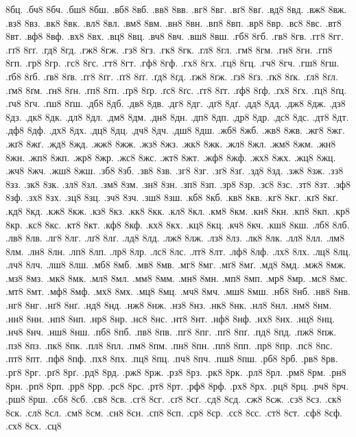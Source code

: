 {8бц.
.бч8
8бч.
.бш8
8бш.
.вб8
8вб.
.вв8
8вв.
.вг8
8вг.
.вґ8
8вґ.
.вд8
8вд.
.вж8
8вж.
.вз8
8вз.
.вк8
8вк.
.вл8
8вл.
.вм8
8вм.
.вн8
8вн.
.вп8
8вп.
.вр8
8вр.
.вс8
8вс.
.вт8
8вт.
.вф8
8вф.
.вх8
8вх.
.вц8
8вц.
.вч8
8вч.
.вш8
8вш.
.гб8
8гб.
.гв8
8гв.
.гг8
8гг.
.гґ8
8гґ.
.гд8
8гд.
.гж8
8гж.
.гз8
8гз.
.гк8
8гк.
.гл8
8гл.
.гм8
8гм.
.гн8
8гн.
.гп8
8гп.
.гр8
8гр.
.гс8
8гс.
.гт8
8гт.
.гф8
8гф.
.гх8
8гх.
.гц8
8гц.
.гч8
8гч.
.гш8
8гш.
.ґб8
8ґб.
.ґв8
8ґв.
.ґг8
8ґг.
.ґґ8
8ґґ.
.ґд8
8ґд.
.ґж8
8ґж.
.ґз8
8ґз.
.ґк8
8ґк.
.ґл8
8ґл.
.ґм8
8ґм.
.ґн8
8ґн.
.ґп8
8ґп.
.ґр8
8ґр.
.ґс8
8ґс.
.ґт8
8ґт.
.ґф8
8ґф.
.ґх8
8ґх.
.ґц8
8ґц.
.ґч8
8ґч.
.ґш8
8ґш.
.дб8
8дб.
.дв8
8дв.
.дг8
8дг.
.дґ8
8дґ.
.дд8
8дд.
.дж8
8дж.
.дз8
8дз.
.дк8
8дк.
.дл8
8дл.
.дм8
8дм.
.дн8
8дн.
.дп8
8дп.
.др8
8др.
.дс8
8дс.
.дт8
8дт.
.дф8
8дф.
.дх8
8дх.
.дц8
8дц.
.дч8
8дч.
.дш8
8дш.
.жб8
8жб.
.жв8
8жв.
.жг8
8жг.
.жґ8
8жґ.
.жд8
8жд.
.жж8
8жж.
.жз8
8жз.
.жк8
8жк.
.жл8
8жл.
.жм8
8жм.
.жн8
8жн.
.жп8
8жп.
.жр8
8жр.
.жс8
8жс.
.жт8
8жт.
.жф8
8жф.
.жх8
8жх.
.жц8
8жц.
.жч8
8жч.
.жш8
8жш.
.зб8
8зб.
.зв8
8зв.
.зг8
8зг.
.зґ8
8зґ.
.зд8
8зд.
.зж8
8зж.
.зз8
8зз.
.зк8
8зк.
.зл8
8зл.
.зм8
8зм.
.зн8
8зн.
.зп8
8зп.
.зр8
8зр.
.зс8
8зс.
.зт8
8зт.
.зф8
8зф.
.зх8
8зх.
.зц8
8зц.
.зч8
8зч.
.зш8
8зш.
.кб8
8кб.
.кв8
8кв.
.кг8
8кг.
.кґ8
8кґ.
.кд8
8кд.
.кж8
8кж.
.кз8
8кз.
.кк8
8кк.
.кл8
8кл.
.км8
8км.
.кн8
8кн.
.кп8
8кп.
.кр8
8кр.
.кс8
8кс.
.кт8
8кт.
.кф8
8кф.
.кх8
8кх.
.кц8
8кц.
.кч8
8кч.
.кш8
8кш.
.лб8
8лб.
.лв8
8лв.
.лг8
8лг.
.лґ8
8лґ.
.лд8
8лд.
.лж8
8лж.
.лз8
8лз.
.лк8
8лк.
.лл8
8лл.
.лм8
8лм.
.лн8
8лн.
.лп8
8лп.
.лр8
8лр.
.лс8
8лс.
.лт8
8лт.
.лф8
8лф.
.лх8
8лх.
.лц8
8лц.
.лч8
8лч.
.лш8
8лш.
.мб8
8мб.
.мв8
8мв.
.мг8
8мг.
.мґ8
8мґ.
.мд8
8мд.
.мж8
8мж.
.мз8
8мз.
.мк8
8мк.
.мл8
8мл.
.мм8
8мм.
.мн8
8мн.
.мп8
8мп.
.мр8
8мр.
.мс8
8мс.
.мт8
8мт.
.мф8
8мф.
.мх8
8мх.
.мц8
8мц.
.мч8
8мч.
.мш8
8мш.
.нб8
8нб.
.нв8
8нв.
.нг8
8нг.
.нґ8
8нґ.
.нд8
8нд.
.нж8
8нж.
.нз8
8нз.
.нк8
8нк.
.нл8
8нл.
.нм8
8нм.
.нн8
8нн.
.нп8
8нп.
.нр8
8нр.
.нс8
8нс.
.нт8
8нт.
.нф8
8нф.
.нх8
8нх.
.нц8
8нц.
.нч8
8нч.
.нш8
8нш.
.пб8
8пб.
.пв8
8пв.
.пг8
8пг.
.пґ8
8пґ.
.пд8
8пд.
.пж8
8пж.
.пз8
8пз.
.пк8
8пк.
.пл8
8пл.
.пм8
8пм.
.пн8
8пн.
.пп8
8пп.
.пр8
8пр.
.пс8
8пс.
.пт8
8пт.
.пф8
8пф.
.пх8
8пх.
.пц8
8пц.
.пч8
8пч.
.пш8
8пш.
.рб8
8рб.
.рв8
8рв.
.рг8
8рг.
.рґ8
8рґ.
.рд8
8рд.
.рж8
8рж.
.рз8
8рз.
.рк8
8рк.
.рл8
8рл.
.рм8
8рм.
.рн8
8рн.
.рп8
8рп.
.рр8
8рр.
.рс8
8рс.
.рт8
8рт.
.рф8
8рф.
.рх8
8рх.
.рц8
8рц.
.рч8
8рч.
.рш8
8рш.
.сб8
8сб.
.св8
8св.
.сг8
8сг.
.сґ8
8сґ.
.сд8
8сд.
.сж8
8сж.
.сз8
8сз.
.ск8
8ск.
.сл8
8сл.
.см8
8см.
.сн8
8сн.
.сп8
8сп.
.ср8
8ср.
.сс8
8сс.
.ст8
8ст.
.сф8
8сф.
.сх8
8сх.
.сц8
}
